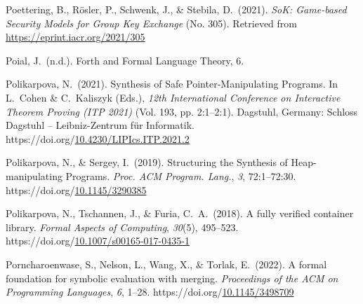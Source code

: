 \documentclass[12pt,twoside]{article}
\begin{document}
{\begin{thebibliography}{1079}
\mdbibitemlabel{}Poettering, B., Rösler, P., Schwenk, J., \& Stebila, D.~(2021). \emph{SoK: Game-based Security Models for Group Key Exchange} (No. 305). Retrieved from \href{https://eprint.iacr.org/2021/305}{{\ttfamily https://\hspace{0pt}eprint.\hspace{0pt}iacr.\hspace{0pt}org/\hspace{0pt}2021/\hspace{0pt}305}}%

\mdbibitemlabel{}Poial, J.~(n.d.). Forth and Formal Language Theory, 6.%

\mdbibitemlabel{}Polikarpova, N.~(2021). Synthesis of Safe Pointer-Manipulating Programs. In L.~Cohen \& C.~Kaliszyk (Eds.), \emph{12th International Conference on Interactive Theorem Proving (ITP 2021)} (Vol. 193, pp. 2:1–2:1). Dagstuhl, Germany: Schloss Dagstuhl – Leibniz-Zentrum für Informatik. https://doi.org/\href{https://dx.doi.org/10.4230/LIPIcs.ITP.2021.2}{10.4230/LIPIcs.ITP.2021.2}%

\mdbibitemlabel{}Polikarpova, N., \& Sergey, I.~(2019). Structuring the Synthesis of Heap-manipulating Programs. \emph{Proc. ACM Program. Lang.}, \emph{3}, 72:1–72:30. https://doi.org/\href{https://dx.doi.org/10.1145/3290385}{10.1145/3290385}%

\mdbibitemlabel{}Polikarpova, N., Tschannen, J., \& Furia, C.~A.~(2018). A fully verified container library. \emph{Formal Aspects of Computing}, \emph{30}(5), 495–523. https://doi.org/\href{https://dx.doi.org/10.1007/s00165-017-0435-1}{10.1007/s00165-017-0435-1}%

\mdbibitemlabel{}Porncharoenwase, S., Nelson, L., Wang, X., \& Torlak, E.~(2022). A formal foundation for symbolic evaluation with merging. \emph{Proceedings of the ACM on Programming Languages}, \emph{6}, 1–28. https://doi.org/\href{https://dx.doi.org/10.1145/3498709}{10.1145/3498709}%


\end{thebibliography}}
\end{document}
